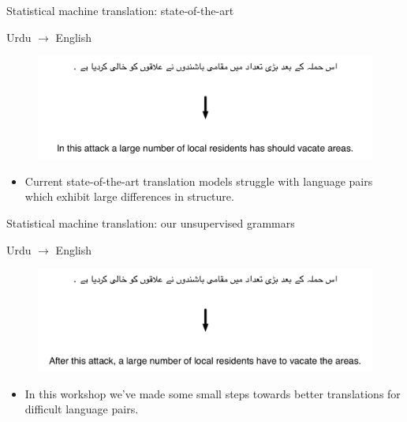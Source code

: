 \documentclass{beamer}
\begin{document}
\begin{frame}[t]{Statistical machine translation: state-of-the-art}
\begin{exampleblock}{Urdu $\rightarrow$ English}
  \begin{figure}
    {\centering \includegraphics[scale=0.55]{urdu-bl.pdf}}
  \end{figure}
\end{exampleblock}
\begin{itemize}
  \item Current state-of-the-art translation models struggle with language pairs which exhibit large differences in structure.
\end{itemize}
\end{frame}

\begin{frame}[t]{Statistical machine translation: our unsupervised grammars}
\begin{exampleblock}{Urdu $\rightarrow$ English}
  \begin{figure}
    {\centering \includegraphics[scale=0.55]{urdu-25hp.pdf}}
  \end{figure}
\end{exampleblock}
\begin{itemize}
  \item In this workshop we've made some small steps towards better translations for difficult language pairs.
\end{itemize}
\end{frame}
\end{document}
